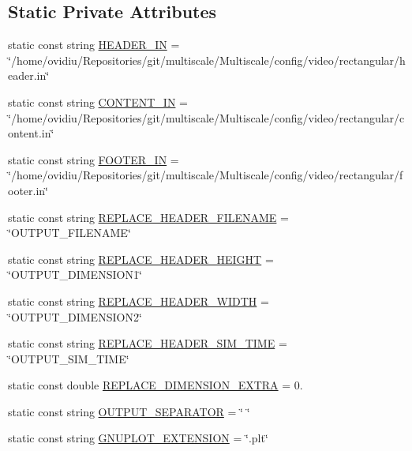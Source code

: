 \subsection*{Static Private Attributes}
\begin{DoxyCompactItemize}
\item 
static const string \hyperlink{classmultiscale_1_1video_1_1RectangularGnuplotScriptGenerator_afeced106138e618bb292826093205023}{H\-E\-A\-D\-E\-R\-\_\-\-I\-N} = \char`\"{}/home/ovidiu/Repositories/git/multiscale/Multiscale/config/video/rectangular/header.\-in\char`\"{}
\item 
static const string \hyperlink{classmultiscale_1_1video_1_1RectangularGnuplotScriptGenerator_abbd954ff4d68e2a6ef9a7a81f615892c}{C\-O\-N\-T\-E\-N\-T\-\_\-\-I\-N} = \char`\"{}/home/ovidiu/Repositories/git/multiscale/Multiscale/config/video/rectangular/content.\-in\char`\"{}
\item 
static const string \hyperlink{classmultiscale_1_1video_1_1RectangularGnuplotScriptGenerator_a5bff725c865bc3a426351644cee34229}{F\-O\-O\-T\-E\-R\-\_\-\-I\-N} = \char`\"{}/home/ovidiu/Repositories/git/multiscale/Multiscale/config/video/rectangular/footer.\-in\char`\"{}
\item 
static const string \hyperlink{classmultiscale_1_1video_1_1RectangularGnuplotScriptGenerator_aba834d6608c58a4ea91d73947f2cfe0a}{R\-E\-P\-L\-A\-C\-E\-\_\-\-H\-E\-A\-D\-E\-R\-\_\-\-F\-I\-L\-E\-N\-A\-M\-E} = \char`\"{}O\-U\-T\-P\-U\-T\-\_\-\-F\-I\-L\-E\-N\-A\-M\-E\char`\"{}
\item 
static const string \hyperlink{classmultiscale_1_1video_1_1RectangularGnuplotScriptGenerator_a7c6bb61b310d321618f22d15f686fd44}{R\-E\-P\-L\-A\-C\-E\-\_\-\-H\-E\-A\-D\-E\-R\-\_\-\-H\-E\-I\-G\-H\-T} = \char`\"{}O\-U\-T\-P\-U\-T\-\_\-\-D\-I\-M\-E\-N\-S\-I\-O\-N1\char`\"{}
\item 
static const string \hyperlink{classmultiscale_1_1video_1_1RectangularGnuplotScriptGenerator_a2b9a87b266a126d6cdd6d6ee1d707b87}{R\-E\-P\-L\-A\-C\-E\-\_\-\-H\-E\-A\-D\-E\-R\-\_\-\-W\-I\-D\-T\-H} = \char`\"{}O\-U\-T\-P\-U\-T\-\_\-\-D\-I\-M\-E\-N\-S\-I\-O\-N2\char`\"{}
\item 
static const string \hyperlink{classmultiscale_1_1video_1_1RectangularGnuplotScriptGenerator_a9eaa6120a15c5055eb6fbe5b1113d806}{R\-E\-P\-L\-A\-C\-E\-\_\-\-H\-E\-A\-D\-E\-R\-\_\-\-S\-I\-M\-\_\-\-T\-I\-M\-E} = \char`\"{}O\-U\-T\-P\-U\-T\-\_\-\-S\-I\-M\-\_\-\-T\-I\-M\-E\char`\"{}
\item 
static const double \hyperlink{classmultiscale_1_1video_1_1RectangularGnuplotScriptGenerator_a90ca6d5bab28ed98c6adf71cb848676e}{R\-E\-P\-L\-A\-C\-E\-\_\-\-D\-I\-M\-E\-N\-S\-I\-O\-N\-\_\-\-E\-X\-T\-R\-A} = 0.
\item 
static const string \hyperlink{classmultiscale_1_1video_1_1RectangularGnuplotScriptGenerator_a8e42e0b2f41ffd1115f6123d45195ed0}{O\-U\-T\-P\-U\-T\-\_\-\-S\-E\-P\-A\-R\-A\-T\-O\-R} = \char`\"{} \char`\"{}
\item 
static const string \hyperlink{classmultiscale_1_1video_1_1RectangularGnuplotScriptGenerator_afa1626f7904b3006ac768f770c799283}{G\-N\-U\-P\-L\-O\-T\-\_\-\-E\-X\-T\-E\-N\-S\-I\-O\-N} = \char`\"{}.plt\char`\"{}
\end{DoxyCompactItemize}


